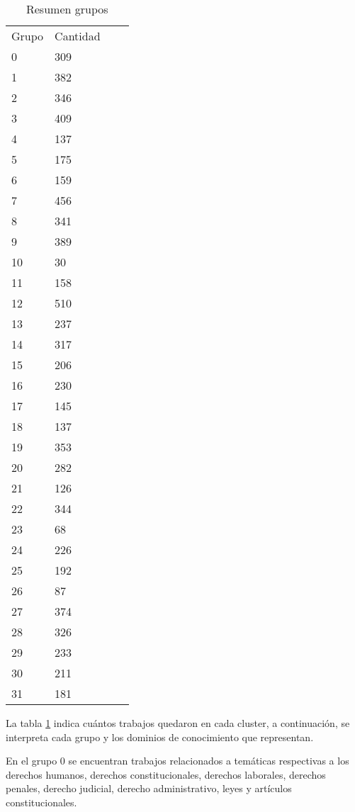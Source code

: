 \begin{table}[H]\centering
\caption{Resumen grupos}\label{tab:tablaeg}
	\begin{tabularx}{\textwidth}{XXXm{3.0cm}}\toprule

Grupo &  \multicolumn{1}{c}{Cantidad } \\ 
0&      309\\
1&     382\\
2&     346\\
3&    409\\
4&   137\\
5&   175\\
6&   159\\
7&   456\\
8&   341\\
9&   389\\
10& 30\\
11& 158\\
12& 510\\
13& 237\\
14& 317\\
15& 206\\
16& 230\\
17& 145\\
18& 137\\
19& 353\\
20& 282\\
21& 126\\
22& 344\\
23& 68\\
24& 226\\
25& 192\\
26& 87\\
27& 374\\
28& 326\\
29& 233\\
30& 211\\
31& 181\\


 \bottomrule
	\end{tabularx}
	
\end{table}

 La tabla  \ref{tab:tablaeg}  indica cuántos trabajos quedaron en cada cluster, a continuación, se interpreta cada grupo y los dominios de conocimiento que representan.

En el grupo 0 se encuentran trabajos relacionados a temáticas respectivas a los derechos humanos, derechos constitucionales, derechos laborales, derechos penales, derecho judicial, derecho administrativo, leyes y artículos constitucionales.

